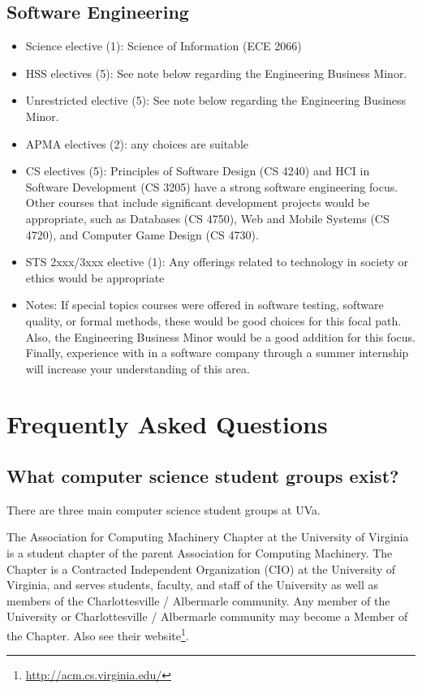 \documentclass[10pt,letter]{book}
\newenvironment{itemlist}{
\begin{itemize}
\setlength{\itemsep}{0pt}
\setlength{\parskip}{0pt}}
{\end{itemize}}
\newcommand{\mysection}[1]{\section{#1}\renewcommand{\rightmark}{#1}}
\newcommand{\myurl}[1]{\footnote{\scriptsize\url{#1}}}
\begin{document}
\subsection{Software Engineering}
\begin{itemlist}
\item Science elective (1): Science of Information (ECE 2066)
\item HSS electives (5): See note below regarding the Engineering
  Business Minor.
\item Unrestricted elective (5): See note below regarding the
  Engineering Business Minor.
\item APMA electives (2): any choices are suitable
\item CS electives (5): Principles of Software Design (CS 4240) and
  HCI in Software Development (CS 3205) have a strong software
  engineering focus. Other courses that include significant development
  projects would be appropriate, such as Databases (CS 4750), Web and
  Mobile Systems (CS 4720), and Computer Game Design (CS 4730).
\item STS 2xxx/3xxx elective (1): Any offerings related to technology
  in society or ethics would be appropriate
\item Notes: If special topics courses were offered in software
  testing, software quality, or formal methods, these would be good
  choices for this focal path. Also, the Engineering Business Minor
  would be a good addition for this focus. Finally, experience with in
  a software company through a summer internship will increase your
  understanding of this area.
\end{itemlist}

\mysection{Frequently Asked Questions}

\subsection{What computer science student groups exist?}

There are three main computer science student groups at UVa.

The Association for Computing Machinery Chapter at the University of
Virginia is a student chapter of the parent Association for Computing
Machinery. The Chapter is a Contracted Independent Organization (CIO)
at the University of Virginia, and serves students, faculty, and staff
of the University as well as members of the Charlottesville /
Albermarle community. Any member of the University or Charlottesville
/ Albermarle community may become a Member of the Chapter.  Also see
their website\myurl{http://acm.cs.virginia.edu/}.
\end{document}
